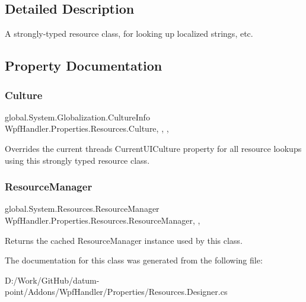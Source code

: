 \subsection{Detailed Description}
A strongly-\/typed resource class, for looking up localized strings, etc. 



\subsection{Property Documentation}
\mbox{\label{class_wpf_handler_1_1_properties_1_1_resources_a9d6eb037cf7891a3ed5b2370e7dfdc23}} 
\subsubsection{\texorpdfstring{Culture}{Culture}}
{\footnotesize\ttfamily global.\+System.\+Globalization.\+Culture\+Info Wpf\+Handler.\+Properties.\+Resources.\+Culture\hspace{0.3cm}{\ttfamily [static]}, {\ttfamily [get]}, {\ttfamily [set]}, {\ttfamily [package]}}



Overrides the current thread\textquotesingle{}s Current\+U\+I\+Culture property for all resource lookups using this strongly typed resource class. 

\mbox{\label{class_wpf_handler_1_1_properties_1_1_resources_a4908c4924066b6d42cc0e042fdae5079}} 
\subsubsection{\texorpdfstring{Resource\+Manager}{ResourceManager}}
{\footnotesize\ttfamily global.\+System.\+Resources.\+Resource\+Manager Wpf\+Handler.\+Properties.\+Resources.\+Resource\+Manager\hspace{0.3cm}{\ttfamily [static]}, {\ttfamily [get]}, {\ttfamily [package]}}



Returns the cached Resource\+Manager instance used by this class. 



The documentation for this class was generated from the following file\+:\begin{DoxyCompactItemize}
\item 
D\+:/\+Work/\+Git\+Hub/datum-\/point/\+Addons/\+Wpf\+Handler/\+Properties/Resources.\+Designer.\+cs\end{DoxyCompactItemize}
